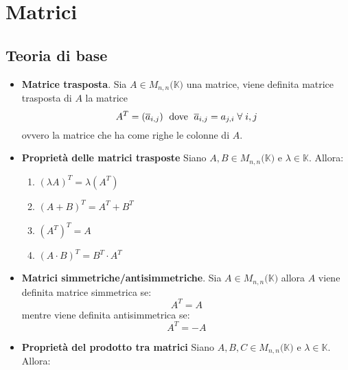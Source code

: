 \documentclass[12pt,a4paper,oneside]{book}
\begin{document}



\newpage

				\chapter{Matrici}

			   \section{Teoria di base}

\begin{itemize}

\item \textbf{Matrice trasposta}. \linebreak
	  Sia $A\in M_{n,n}(\mathbb{K)}$ una matrice, viene definita matrice trasposta di $A$ la matrice 	
	  $$A^{T}=(\overline{a}_{i,j}) \text{\hspace{0.1cm} dove \hspace{0.1cm}}\overline{a}_{i,j} = a_{j,i} 
	  \hspace{0.1cm} \forall \hspace{0.1cm}i, j$$ \hfill 
	  \break ovvero la matrice che ha come righe le colonne di $A$.
	
\item \textbf{Proprietà delle matrici trasposte} \linebreak
	  Siano $A,B\in M_{n,n}(\mathbb{K)}$ e $\lambda\in \mathbb{K}$. Allora:
	  
	  \begin{enumerate}
	  \item $(\lambda A)^T=\lambda(A^T)$
	  \item $(A+B)^T=A^T+B^T$
	  \item $(A^T)^T=A$
	  \item $(A\cdot B)^T = B^T\cdot A^T$
	  \end{enumerate}
	
\item \textbf{Matrici simmetriche/antisimmetriche}. \linebreak
	  Sia $A\in M_{n,n}(\mathbb{K)}$ allora $A$ viene definita matrice simmetrica se:
	  $$A^T=A$$
	  mentre viene definita antisimmetrica se:
	  $$A^T=-A$$
	
\item \textbf{Proprietà del prodotto tra matrici} \linebreak
	  Siano $A,B, C\in M_{n,n}(\mathbb{K)}$ e $\lambda\in \mathbb{K}$. Allora:
	  

\end{itemize}
\end{document}
